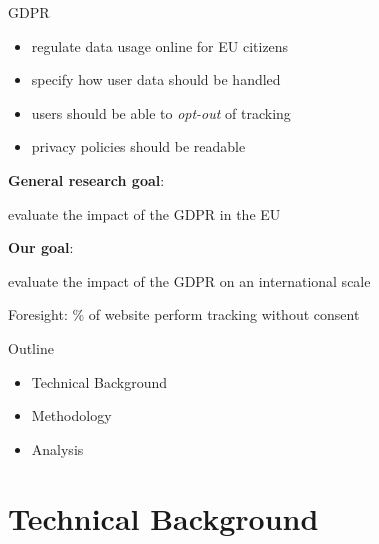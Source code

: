 \documentclass[xcolor={dvipsnames}]{beamer}
\begin{document}
\begin{frame}{GDPR}
	\begin{itemize}
		\item regulate data usage online for EU citizens
        \item specify how user data should be handled
        \item users should be able to \emph{opt-out} of tracking
		\item privacy policies should be readable
	\end{itemize}

    \pause
    \textbf{General research goal}:

    \begin{center}
        evaluate the impact of the GDPR in the EU
    \end{center}

    \pause
    \textbf{Our goal}:

    \begin{center}
        evaluate the impact of the GDPR on an international scale
    \end{center}


    \pause
    Foresight: \% of website perform tracking without consent
\end{frame}

\begin{frame}{Outline}
    \begin{itemize}
        \item Technical Background
        \item Methodology
        \item Analysis
    \end{itemize}
\end{frame}

\section{Technical Background}
\end{document}
